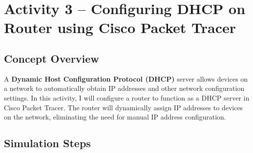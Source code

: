 \documentclass[11pt,a4paper]{article}
\begin{document}
\section{Activity 3 – Configuring DHCP on Router using Cisco Packet Tracer}

\subsection{Concept Overview}

A \textbf{Dynamic Host Configuration Protocol (DHCP)} server allows devices on a network to automatically obtain IP addresses and other network configuration settings. In this activity, I will configure a router to function as a DHCP server in Cisco Packet Tracer. The router will dynamically assign IP addresses to devices on the network, eliminating the need for manual IP address configuration.

\subsection{Simulation Steps}
\end{document}
